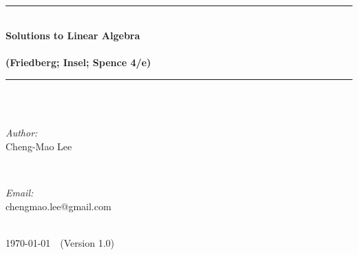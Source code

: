 \begin{titlepage}
$\mathbb{}$

\newcommand{\HRule}{\rule{\linewidth}{0.5mm}} %

\center %




~\\[4cm]
\HRule \\[0.4cm]
{ \huge \bfseries Solutions to Linear Algebra\\
~\\
(Friedberg; Insel; Spence 4/e) }\\[0.4cm] %
\HRule \\[1.5cm]


~\\[2cm]
\begin{minipage}{0.4\textwidth}
\begin{flushleft} \large
\emph{Author:}\\
Cheng-Mao Lee
\end{flushleft}
\end{minipage}
~
\begin{minipage}{0.4\textwidth}
\begin{flushleft} \large
\emph{Email:} \\
chengmao.lee@gmail.com
\end{flushleft}
\end{minipage}\\[6cm]



{\large \today\ \ (Version 1.0) }\\[3cm] %


\end{titlepage}
